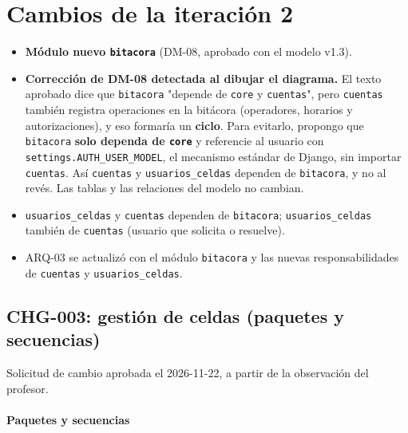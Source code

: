 \section{Cambios de la iteración 2}




\begin{itemize}
  \item \textbf{Módulo nuevo \texttt{bitacora}} (DM-08, aprobado con el modelo v1.3).
  \item \textbf{Corrección de DM-08 detectada al dibujar el diagrama.} El texto aprobado dice que \texttt{bitacora} "depende de \texttt{core} y \texttt{cuentas}", pero \texttt{cuentas} también registra operaciones en la bitácora (operadores, horarios y autorizaciones), y eso formaría un \textbf{ciclo}. Para evitarlo, propongo que \texttt{bitacora} \textbf{solo dependa de \texttt{core}} y referencie al usuario con \texttt{settings.AUTH\_USER\_MODEL}, el mecanismo estándar de Django, sin importar \texttt{cuentas}. Así \texttt{cuentas} y \texttt{usuarios\_celdas} dependen de \texttt{bitacora}, y no al revés. Las tablas y las relaciones del modelo no cambian.
  \item \texttt{usuarios\_celdas} y \texttt{cuentas} dependen de \texttt{bitacora}; \texttt{usuarios\_celdas} también de \texttt{cuentas} (usuario que solicita o resuelve).
  \item ARQ-03 se actualizó con el módulo \texttt{bitacora} y las nuevas responsabilidades de \texttt{cuentas} y \texttt{usuarios\_celdas}.
\end{itemize}



\subsection{CHG-003: gestión de celdas (paquetes y secuencias)}
Solicitud de cambio aprobada el 2026-11-22, a partir de la observación del profesor.

\paragraph{Paquetes y secuencias}

